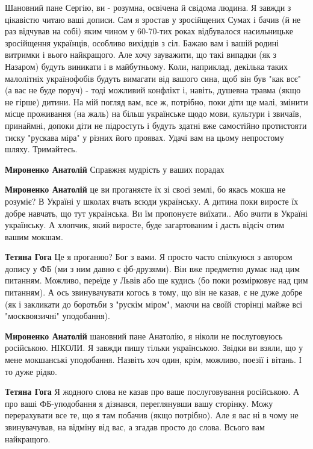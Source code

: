 \begin{itemize}

Шановний пане Сергію, ви - розумна, освічена й свідома людина. Я завжди з
цікавістю читаю ваші дописи. Сам я зростав у зросійщених Сумах і бачив (й не
раз відчував на собі) яким чином у 60-70-тих роках відбувалося насильницьке
зросійщення українців, особливо вихідців з сіл. Бажаю вам і вашій родині
витримки і вього найкращого. Але хочу зауважити, що такі випадки (як з Назаром)
будуть виникати і в майбутньому. Коли, наприклад, декілька таких малолітніх
українофобів будуть вимагати від вашого сина, щоб він був "как всє" (а вас не
буде поруч) - тоді можливий конфлікт і, навіть, душевна травма (якщо не гірше)
дитини. На мій погляд вам, все ж, потрібно, поки діти ще малі, змінити місце
проживання (на жаль) на більш українське щодо мови, культури і звичаїв,
принаймні, допоки діти не підростуть і будуть здатні вже самостійно протистояти
тиску "рускава міра" у різних його проявах. Удачі вам на цьому непростому
шляху. Тримайтесь.

\begin{itemize} %
\textbf{Мироненко Анатолій} Справжня мудрість у ваших порадах

\textbf{Мироненко Анатолій }це ви проганяєте їх зі своєї землі, бо якась мокша не розуміє? В Україні у школах вчать всюди українську. А дитина поки виросте їх добре навчать, що тут українська. Ви їм пропонуєте виїхати.. Або вчити в Україні українську. А хлопчик, який виросте, буде загартованим і дасть відсіч отим вашим мокшам.

\textbf{Тетяна Гога} Це я проганяю? Бог з вами. Я просто часто спілкуюся з автором допису у ФБ (ми з ним давно є фб-друзями). Він вже предметно думає над цим питанням. Можливо, переїде у Львів або ще кудись (бо поки розмірковує над цим питанням). А ось звинувачувати когось в тому, що він не казав, є не дуже добре (як і закликати до боротьби з "рускім міром", маючи на своїй сторінці майже всі "москвоязичні" уподобання).

\textbf{Мироненко Анатолій} шановний пане Анатолію, я ніколи не послуговуюсь російською. НІКОЛИ. Я завжди пишу тільки українською. Звідки ви взяли, що у мене мокшанські уподобання. Назвіть хоч один, крім, можливо, поезії і вітань. І то дуже рідко.

\textbf{Тетяна Гога} Я жодного слова не казав про ваше послуговування російською. А про ваші ФБ-уподобання я дізнався, переглянувши вашу сторінку. Можу перерахувати все те, що я там побачив (якщо потрібно). Але я вас ні в чому не звинувачував, на відміну від вас, а згадав просто до слова. Всього вам найкращого.


\end{itemize}
\end{itemize}
